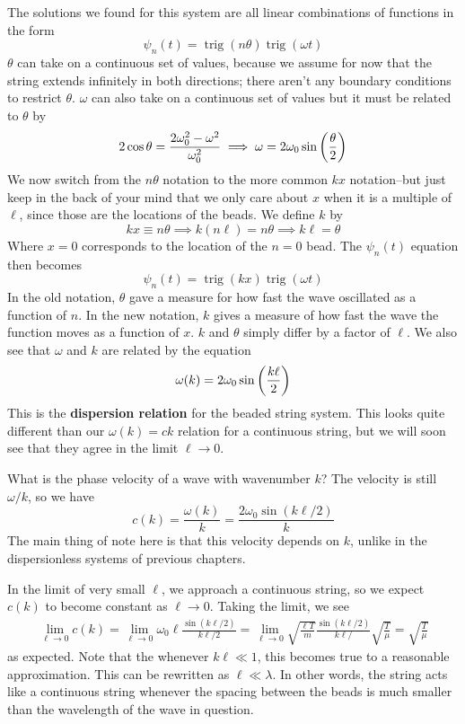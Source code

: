 The solutions we found for this system are all linear combinations of functions in the form
\[ \psi_n(t) = \operatorname{trig}(n\theta)\operatorname{trig}(\omega t)\]
$\theta$ can take on a continuous set of values, because we assume for now that the string extends infinitely in both directions; there aren't any boundary conditions to restrict $\theta$. $\omega$ can also take on a continuous set of values but it must be related to $\theta$ by
\[ 2\cos\theta = \frac{2\omega_0^2 - \omega^2}{\omega_0^2} \implies \omega = 2\omega_0 \sin\pqty{\frac{\theta}{2}}\]
We now switch from the $n\theta$ notation to the more common $kx$ notation--but just keep in the back of your mind that we only care about $x$ when it is a multiple of $\ell$, since those are the locations of the beads. We define $k$ by
\[ kx \equiv n\theta \implies k(n\ell) = n\theta \implies k\ell=\theta\]
Where $x=0$ corresponds to the location of the $n=0$ bead. The $\psi_n(t)$ equation then becomes
\[ \psi_n(t) = \operatorname{trig}(kx)\operatorname{trig}(\omega t)\]
In the old notation, $\theta$ gave a measure for how fast the wave oscillated as a function of $n$. In the new notation, $k$ gives a measure of how fast the wave the function moves as a function of $x$. $k$ and $\theta$ simply differ by a factor of $\ell$. We also see that $\omega$ and $k$ are related by the equation
\[ \omega(k) = 2\omega_0 \sin\pqty{\frac{k\ell}{2}} \]
This is the \textbf{dispersion relation} for the beaded string system. This looks quite different than our $\omega(k) = ck$ relation for a continuous string, but we will soon see that they agree in the limit $\ell\to 0$.

What is the phase velocity of a wave with wavenumber $k$? The velocity is still $\omega/k$, so we have
\[ c(k) = \frac{\omega(k)}{k} = \frac{2\omega_0\sin(k\ell/2)}{k}\]
The main thing of note here is that this velocity depends on $k$, unlike in the dispersionless systems of previous chapters. 

In the limit of very small $\ell$, we approach a continuous string, so we expect $c(k)$ to become constant as $\ell \to 0$. Taking the limit, we see
\begin{align*}
    \lim_{\ell\to0} c(k) = \lim_{\ell\to 0}\omega_0 \ell \frac{\sin(k\ell/2)}{k\ell/2} = \lim_{\ell\to 0} \sqrt{\frac{\ell T}{m}} \frac{\sin(k\ell/2)}{k\ell/} \sqrt{\frac{T}{\mu}} = \sqrt{\frac{T}{\mu}}
\end{align*}
as expected. Note that the whenever $k\ell \ll 1$, this becomes true to a reasonable approximation. This can be rewritten as $\ell \ll \lambda$. In other words, the string acts like a continuous string whenever the spacing between the beads is much smaller than the wavelength of the wave in question.
